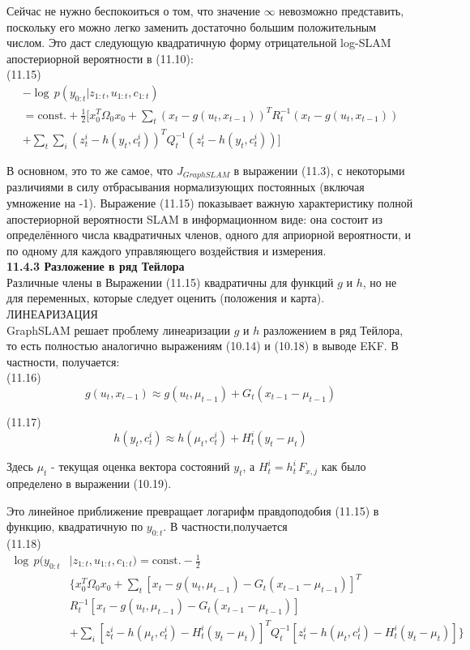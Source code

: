 \documentclass[10pt,a4paper]{article}
\begin{document}
Сейчас не нужно беспокоиться о том, что значение $\infty$ невозможно представить, поскольку его можно легко заменить достаточно большим положительным числом. Это даст следующую квадратичную форму отрицательной log-SLAM апостериорной вероятности в (11.10):\\

(11.15)
\begin{multline*}
-\log\,p(y_{0:t}|z_{1:t},u_{1:t},c_{1:t})\\
=\text{const.}+\frac{1}{2}[  x_0^T\varOmega_0x_0+\sum_t(x_t-g(u_t,x_{t-1}))^TR_t^{-1}(x_t-g(u_t,x_{t-1})) \\
+ \sum_t\sum_i(z_t^i-h(y_t,c_t^i))^TQ_t^{-1}(z_t^i-h(y_t,c_t^i))]  
\end{multline*}

В основном, это то же самое, что $J_{GraphSLAM}$ в выражении (11.3), с некоторыми различиями в силу отбрасывания нормализующих постоянных (включая умножение на -1). Выражение (11.15) показывает важную характеристику полной апостериорной вероятности SLAM в информационном виде: она состоит из определённого числа квадратичных членов, одного для априорной вероятности, и по одному для каждого управляющего воздействия и измерения.\\

\textbf{11.4.3	Разложение в ряд Тейлора}\\

Различные члены в Выражении (11.15) квадратичны для функций $g$ и $h$, но не для переменных, которые следует оценить (положения и карта).\\
ЛИНЕАРИЗАЦИЯ\\
GraphSLAM решает проблему линеаризации $g$ и $h$ разложением в ряд Тейлора, то есть полностью аналогично выражениям (10.14) и (10.18) в выводе EKF. В частности, получается:\\

(11.16)
$$g(u_t,x_{t-1})\approx g(u_t,\mu_{t-1})+G_t(x_{t-1}-\mu_{t-1})$$

(11.17)
$$h(y_t,c_t^i)\approx h(\mu_t,c_t^i)+H_t^i(y_t-\mu_t)$$

Здесь $\mu_t$ - текущая оценка вектора состояний $y_t$, а $H_t^i=h_t^i\,F_{x,j}$ как было определено в выражении (10.19).

Это линейное приближение превращает логарифм правдоподобия (11.15) в функцию, квадратичную по $y_{0:t}$. В частности,получается\\

(11.18)
\begin{equation*}
\begin{split}
\log\,p(y_{0:t}&|z_{1:t},u_{1:t},c_{1:t})=\text{const.}-\frac{1}{2}\\
&\{x_0^T\varOmega_0x_0+\sum_t[x_t-g(u_t,\mu_{t-1})-G_t(x_{t-1}-\mu_{t-1})]^T\\
&R_t^{-1}[x_t-g(u_t,\mu_{t-1})-G_t(x_{t-1}-\mu_{t-1})]\\
&+\sum_i [z_t^i-h(\mu_t,c_t^i)-H_t^i(y_t-\mu_t)]^TQ_t^{-1}[z_t^i-h(\mu_t,c_t^i)-H_t^i(y_t-\mu_t)]\} 
\end{split}
\end{equation*}
\end{document}
